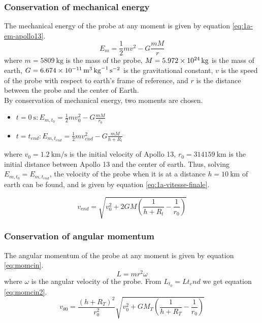\documentclass[a4paper,12pt,twoside]{article}
\begin{document}
\subsubsection{Conservation of mechanical energy}
The mechanical energy of the probe at any moment is given by equation \eqref{eq:1a-em-apollo13}.
\begin{equation}
  E_m = \frac{1}{2}mv^2 - G\frac{mM}{r}
  \label{eq:1a-em-apollo13}
\end{equation}
where $m=\SI{5809}{\kilo\gram}$ is the mass of the probe, $M=\SI{5.972d24}{\kilo\gram}$ is the mass of earth, $G=\SI{6.674d-11}{\cubic\meter\per\kilo\gram\per\square\second}$ is the gravitational constant, $v$ is the speed of the probe with respect to earth's frame of reference, and $r$ is the distance between the probe and the center of Earth.\\

By conservation of mechanical energy, two moments are chosen.
\begin{itemize}
  \item $t=\SI{0}{\s}: E_{m,t_0} = \frac{1}{2}mv_0^2 - G\frac{mM}{r_0}$
  \item $t=t_{end}: E_{m,t_{end}} = \frac{1}{2}mv_{end}^2 - G\frac{mM}{h + R_t}$
\end{itemize}
where $v_0 = \SI{1.2}{\kilo\meter\per\second}$ is the initial velocity of Apollo 13, $r_0 = \SI{314159}{\kilo\meter}$ is the initial distance between Apollo 13 and the center of earth.
Thus, solving $E_{m,t_0} = E_{m,t_{end}}$, the velocity of the probe when it is at a distance $h=\SI{10}{\kilo\meter}$ of earth can be found, and is given by equation \eqref{eq:1a-vitesse-finale}.

\begin{equation}
  v_{end} = \sqrt{v_0^2 + 2GM\left(\frac{1}{h + R_t} - \frac{1}{r_0}\right)}
  \label{eq:1a-vitesse-finale}
\end{equation}

\subsubsection{Conservation of angular momentum}
The angular momentum of the probe at any moment is given by equation \eqref{eq:momcin}.
\begin{equation}
L = mr^2 \omega
\label{eq:momcin}
\end{equation}
where $\omega$ is the angular velocity of the probe. From $ L_{t_0} = L{t_end} $ we get equation \eqref{eq:momcin2}.
\begin{equation}
v_{\theta 0} = \frac{(h+R_T)^2}{r_0^2} \sqrt{v_0^2 + G M_T \left(\frac{1}{h+R_T}-\frac{1}{r_0}\right)} 
\label{eq:momcin2}
\end{equation}
\end{document}
